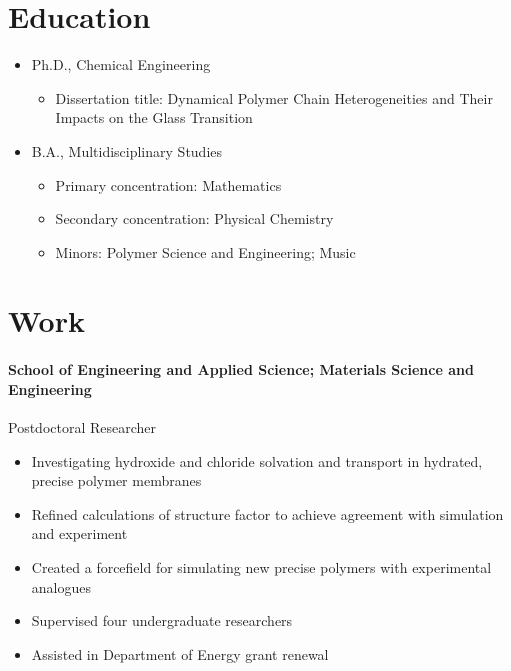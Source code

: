\documentclass{my_cv}
\begin{document}

\section{Education}
\begin{itemize}
    \item Ph.D., Chemical Engineering
    \begin{itemize}
        \item Dissertation title: Dynamical Polymer Chain Hetero\-ge\-ne\-i\-ties and Their Impacts on the Glass Transition
    \end{itemize}
\end{itemize}
\begin{itemize}
    \item B.A., Multidisciplinary Studies
    \begin{itemize}
        \item Primary concentration: Mathematics
        \item Secondary concentration: Physical Chemistry
    \item Minors: Polymer Science and Engineering; Music
    \end{itemize}
\end{itemize}

\section{Work}
\paragraph{School of Engineering and Applied Science; Materials Science and Engineering\\}
Post\-doctoral Researcher
\begin{itemize}
    \item Investigating hydroxide and chloride solvation and transport in hydrated, precise polymer membranes
    \item Refined calculations of structure factor to achieve agreement with simulation and experiment
    \item Created a force\-field for simulating new precise polymers with experimental analogues
    \item Supervised four undergraduate researchers
    \item Assisted in Department of Energy grant renewal
\end{itemize}
\end{document}
